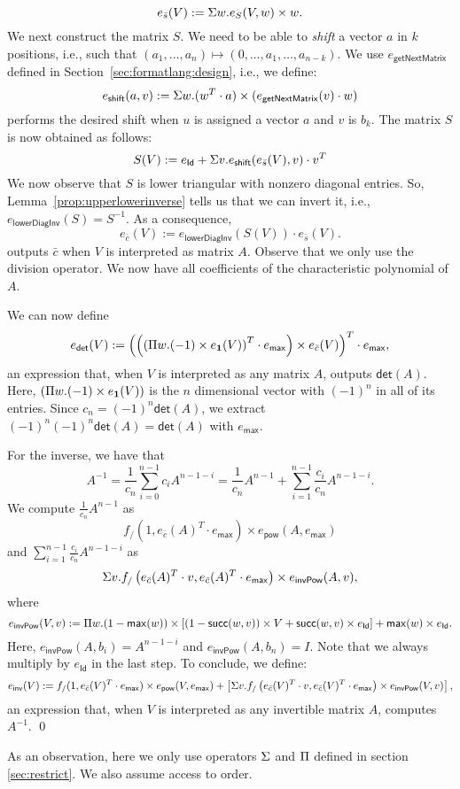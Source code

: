     $$
    e_{\bar s}(V):=\Sigma w.e_{S}(V,w)\times w.
    $$
    We next construct the matrix $S$. We need to be able to \textit{shift} a vector $a$ in $k$ positions, i.e.,
    such that $(a_1,\ldots,a_n)\mapsto (0,\ldots,a_1,\ldots,a_{n-k})$. We use $e_{\mathsf{getNextMatrix}}$ 
    defined in Section~\ref{sec:formatlang:design}, i.e., we define:
    $$
    e_{\mathsf{shift}}(a,v):=\Sigma w.(w^T\cdot a)\times(e_{\mathsf{getNextMatrix}}(v)\cdot w)
    $$
    performs the desired shift when $u$ is assigned a vector $a$ and $v$ is $b_k$. 
    The matrix $S$ is now obtained as follows:
    $$
    S(V):= e_{\mathsf{Id}} + \Sigma v. e_{\mathsf{shift}}(e_{\bar s}(V), v)\cdot v^T
    $$
    We now observe that $S$ is lower triangular with nonzero diagonal entries. So,
    Lemma~\ref{prop:upperlowerinverse} tells us that we can invert it, i.e.,
    $e_{\mathsf{lowerDiagInv}}(S)=S^{-1}$. As a consequence,
    $$
    e_{\bar c}(V):=e_{\mathsf{lowerDiagInv}}(S(V))\cdot e_{\bar s}(V).
    $$
    outputs $\bar c$ when $V$ is interpreted as matrix $A$. Observe that we only use the division operator. We now have all coefficients of the characteristic polynomial of $A$.


    We can now define
    $$
    e_{\mathsf{det}}(V):=\left( \left(\left( \Pi w. (-1)\times e_{\mathbf{1}}(V)\right)^T\cdot e_{\mathsf{max}}\right) \times e_{\bar c}(V) \right)^T\cdot e_{\mathsf{max}},
    $$
    an expression that, when $V$ is interpreted as any matrix $A$, outputs $\mathsf{det}(A)$.
    Here, $(\Pi w. (-1)\times e_{\mathbf{1}}(V))$ is the $n$ dimensional vector with $(-1)^n$ in all of its entries.
    Since $c_n=(-1)^n\mathsf{det}(A)$, we extract $(-1)^n(-1)^n\mathsf{det}(A)=\mathsf{det}(A)$ with $e_{\mathsf{max}}$.

    For the inverse, we have that
    $$
    A^{-1}=\frac{1}{c_n}\sum_{i=0}^{n-1}c_i A^{n-1-i} = \frac{1}{c_n}A^{n-1} + \sum_{i=1}^{n-1}\frac{c_i}{c_n}A^{n-1-i}.
    $$
    We compute $\frac{1}{c_n}A^{n-1}$ as
    $$
    f_{/}(1, e_{\bar c}(A)^T\cdot e_{\mathsf{max}})\times e_{\mathsf{pow}}(A, e_{\mathsf{max}})
    $$
    and $\sum_{i=1}^{n-1}\frac{c_i}{c_n}A^{n-1-i}$ as
    $$
    \Sigma v. f_{/}\left( e_{\bar c}(A)^T\cdot v, e_{\bar c}(A)^T\cdot e_{\mathsf{max}} \right)\times e_{\mathsf{invPow}}(A, v),
    $$
    where
    $$
    e_{\mathsf{invPow}}(V, v):= \Pi w. (1-\mathsf{max}(w)) \times \left[ (1 - \mathsf{succ}(w,v))\times V + \mathsf{succ}(w,v)\times e_{\mathsf{Id}} \right] + \mathsf{max}(w)\times e_{\mathsf{Id}}.
    $$
    Here, $e_{\mathsf{invPow}}(A, b_i)=A^{n-1-i}$ and $e_{\mathsf{invPow}}(A, b_n)=I$.
    Note that we always multiply by $e_{\mathsf{Id}}$ in the last step.
    To conclude, we define:
    $$
    e_{\mathsf{inv}}(V):= f_{/}(1, e_{\bar c}(V)^T\cdot e_{\mathsf{max}})\times e_{\mathsf{pow}}(V, e_{\mathsf{max}}) + \left[ \Sigma v. f_{/}\left( e_{\bar c}(V)^T\cdot v, e_{\bar c}(V)^T\cdot e_{\mathsf{max}} \right)\times e_{\mathsf{invPow}}(V, v) \right],
    $$
    an expression that, when $V$ is interpreted as any invertible matrix $A$, computes $A^{-1}$. \qed

As an observation, here we only use operators $\Sigma$ and $\Pi$ defined in section \ref{sec:restrict}. 
We also assume access to order.
